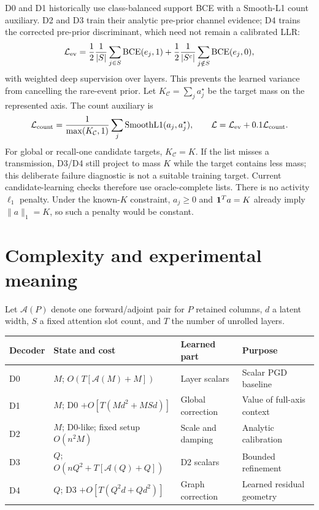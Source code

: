 \documentclass[11pt]{article}
\begin{document}
D0 and D1 historically use class-balanced support BCE with a Smooth-L1 count auxiliary. D2 and D3 train their analytic
pre-prior channel evidence; D4 trains the corrected pre-prior discriminant, which need not remain a calibrated LLR:
\[
 \mathcal L_{\rm ev}
 =\frac12\frac{1}{|S|}\sum_{j\in S}\operatorname{BCE}(e_j,1)
 +\frac12\frac{1}{|S^c|}\sum_{j\notin S}\operatorname{BCE}(e_j,0),
\]
with weighted deep supervision over layers. This prevents the learned variance from cancelling the rare-event prior.
Let $K_{\mathcal C}=\sum_ja_j^\star$ be the target mass on the represented axis. The count auxiliary is
\[
 \mathcal L_{\rm count}
 =\frac1{\max(K_{\mathcal C},1)}\sum_j\operatorname{SmoothL1}(a_j,a_j^\star),
 \qquad
 \mathcal L=\mathcal L_{\rm ev}+0.1\mathcal L_{\rm count}.
\]
For global or recall-one candidate targets, $K_{\mathcal C}=K$. If the list misses a transmission, D3/D4 still
project to mass $K$ while the target contains less mass; this deliberate failure diagnostic is not a suitable training
target. Current candidate-learning checks therefore use oracle-complete lists.
There is no activity $\ell_1$ penalty. Under the known-$K$ constraint, $a_j\ge0$ and $\mathbf{1}^Ta=K$ already imply
$\|a\|_1=K$, so such a penalty would be constant.

\section{Complexity and experimental meaning}

Let $\mathcal A(P)$ denote one forward/adjoint pair for $P$ retained columns, $d$ a latent width, $S$ a fixed attention
slot count, and $T$ the number of unrolled layers.
\begin{center}
\footnotesize
\renewcommand{\arraystretch}{0.92}
\begin{tabularx}{\textwidth}{@{}lYYY@{}}
\toprule
Decoder & State and cost & Learned part & Purpose \\
\midrule
D0 & $M$; $O(T[\mathcal A(M)+M])$ & Layer scalars & Scalar PGD baseline \\
D1 & $M$; D0 $+O[T(Md^2+MSd)]$ & Global correction & Value of full-axis context \\
D2 & $M$; D0-like; fixed setup $O(n^2M)$ & Scale and damping & Analytic calibration \\
D3 & $Q$; $O(nQ^2+T[\mathcal A(Q)+Q])$ & D2 scalars & Bounded refinement \\
D4 & $Q$; D3 $+O[T(Q^2d+Qd^2)]$ & Graph correction & Learned residual geometry \\
\bottomrule
\end{tabularx}
\end{center}
\end{document}
